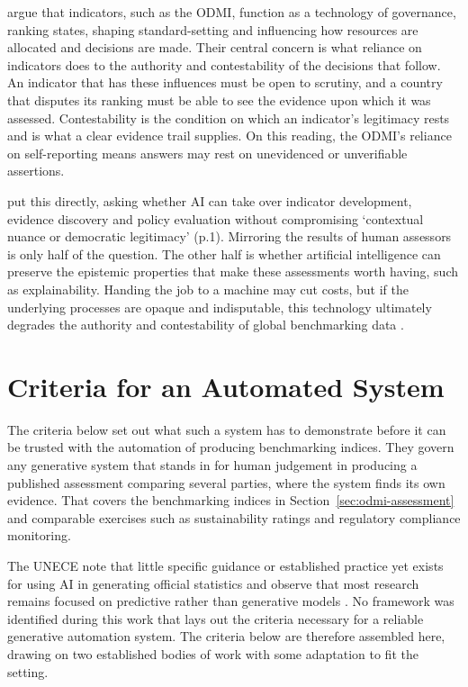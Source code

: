 \citet{davis2012} argue that indicators, such as the ODMI, function as a technology of governance, ranking states, shaping standard-setting and influencing how resources are allocated and decisions are made. Their central concern is what reliance on indicators does to the authority and contestability of the decisions that follow. An indicator that has these influences must be open to scrutiny, and a country that disputes its ranking must be able to see the evidence upon which it was assessed. Contestability is the condition on which an indicator's legitimacy rests and is what a clear evidence trail supplies. On this reading, the ODMI's reliance on self-reporting means answers may rest on unevidenced or unverifiable assertions. 

\citet{fumega2026} put this directly, asking whether AI can take over indicator development, evidence discovery and policy evaluation without compromising `contextual nuance or democratic legitimacy' (p.1). Mirroring the results of human assessors is only half of the question. The other half is whether artificial intelligence can preserve the epistemic properties that make these assessments worth having, such as explainability. Handing the job to a machine may cut costs, but if the underlying processes are opaque and indisputable, this technology ultimately degrades the authority and contestability of global benchmarking data \citep{davis2012}.

\section{Criteria for an Automated System}\label{sec:criteria}

The criteria below set out what such a system has to demonstrate before it can be trusted with the automation of producing benchmarking indices. They govern any generative system that stands in for human judgement in producing a published assessment comparing several parties, where the system finds its own evidence. That covers the benchmarking indices in Section~\ref{sec:odmi-assessment} and comparable exercises such as sustainability ratings and regulatory compliance monitoring.

The UNECE note that little specific guidance or established practice yet exists for using AI in generating official statistics and observe that most research remains focused on predictive rather than generative models \citep{unece2025}. No framework was identified during this work that lays out the criteria necessary for a reliable generative automation system. The criteria below are therefore assembled here, drawing on two established bodies of work with some adaptation to fit the setting.

